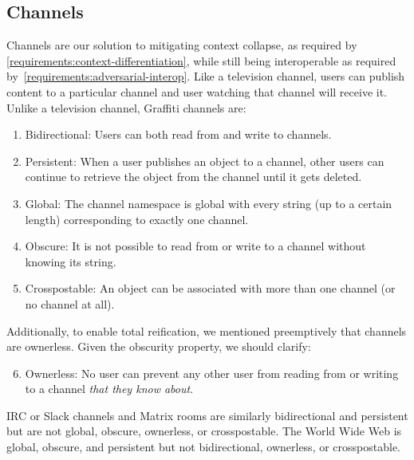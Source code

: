 

\subsection{Channels}
\label{concepts:channels}

Channels are our solution to mitigating context collapse, as required by
\ref{requirements:context-differentiation}, while still being
interoperable as required by~\ref{requirements:adversarial-interop}.
Like a television channel, users can publish content to a particular channel
and user watching that channel will receive it.
Unlike a television channel, Graffiti channels are:

\begin{enumerate}
\item
Bidirectional: Users can both read from and write to channels.
\item
Persistent: When a user publishes an object to a channel, other users can
continue to retrieve the object from the channel until it gets deleted.
\item
Global: The channel namespace is global with every string (up to a certain length)
corresponding to exactly one channel.
\item
Obscure: It is not possible to read from or write to a channel without knowing
its string.
\item
Crosspostable: An object can be associated with more than one channel (or no channel at all).
\end{enumerate}

Additionally, to enable total reification, we mentioned preemptively that channels are ownerless.
Given the obscurity property, we should clarify:

\begin{enumerate}
\setcounter{enumi}{5}
\item
Ownerless: No user can prevent any other user from reading from or writing to a channel
\emph{that they know about}.
\end{enumerate}

IRC or Slack channels and Matrix rooms are similarly bidirectional and persistent
but are not global, obscure, ownerless, or crosspostable.
The World Wide Web is global, obscure, and persistent
but not bidirectional, ownerless, or crosspostable.

